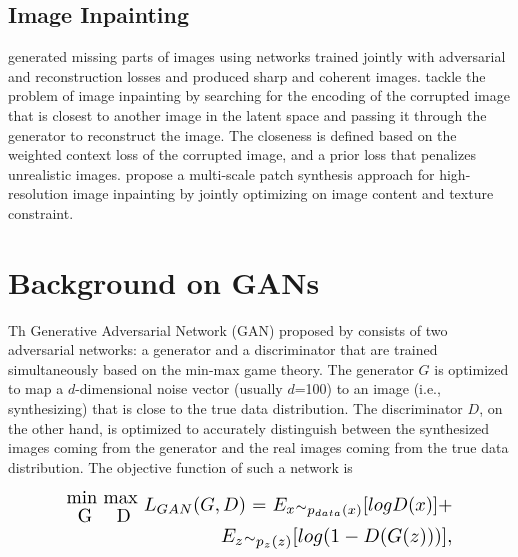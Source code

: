 \documentclass[times,twocolumn,final,authoryear]{elsarticle_modified}
\begin{document}
\vspace{-5pt}

\subsection{Image Inpainting}
\cite{pathak2016context} generated missing parts of images using networks trained jointly with adversarial and reconstruction losses and produced sharp and coherent images. \cite{yeh2017semantic} tackle the problem of image inpainting by searching for the encoding of the corrupted image that is closest to another image in the latent space and passing it through the generator to reconstruct the image. The closeness is defined based on the weighted context loss of the corrupted image, and a prior loss that penalizes unrealistic images. \cite{yang2017high} propose a multi-scale patch synthesis approach for high-resolution image inpainting by jointly optimizing on image content and texture constraint.

















 \vspace{-5pt}
\section{Background on GANs}
\label{sec:background}
Th Generative Adversarial Network (GAN) proposed by \cite{goodfellow2014generative} consists of two adversarial networks: a generator and a discriminator that are trained simultaneously based on the min-max game theory. The generator $G$ is optimized to map a $d$-dimensional noise vector (usually $d$=100) to an image (i.e., synthesizing) that is close to the true data distribution. The discriminator $D$, on the other hand, is optimized to accurately distinguish between the synthesized images coming from the generator and the real images coming from the true data distribution. The objective function of such a network is 
\vspace{-15pt}

\begin{equation}
\begin{split}
\resizebox{0.8\hsize}{!}{$\stackanchor{min }{G}  \stackanchor{max  }{D} L_{GAN} (G,D) $ = $ E_{x} {\raise.01ex\hbox{$\scriptstyle\sim$}}_{p_{data}(x)} [log D(x) ]+
$}\\ \hspace*{0.5in}
\resizebox{0.48\hsize}{!}{$E_{z}  {\raise.01ex\hbox{$\scriptstyle\sim$}}_{p_z(z)}[log(1 - D(G(z)))],
$}\end{split}
\end{equation}
\end{document}
